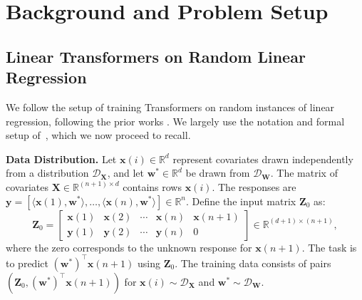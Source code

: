 \documentclass[11pt]{article}
\numberwithin{equation}{section}
\begin{document}
\section{Background and Problem Setup}
\label{Section:LinearTransformerArchitecture}
\vspace{-6pt}
\subsection{Linear Transformers on Random Linear Regression}
We follow the setup of training Transformers on random instances of linear regression, following the prior works \citep{garg2022can, akyurek2022learning, von2023transformers, ahn2024transformers}. We largely use the notation and formal setup of~\citep{ahn2024transformers}, which we now proceed to recall.

\textbf{Data Distribution.} Let \(\mathbf{x}(i) \in \mathbb{R}^d\) represent covariates drawn independently from a distribution \(\mathcal{D}_{\mathbf{X}}\), and let \(\mathbf{w}^* \in \mathbb{R}^d\) be drawn from \(\mathcal{D}_{\mathbf{W}}\). The matrix of covariates \(\mathbf{X} \in \mathbb{R}^{(n + 1) \times d}\) contains rows \(\mathbf{x}(i)\). The responses are \(\mathbf{y} = [\langle \mathbf{x}(1), \mathbf{w}^* \rangle, \dots, \langle \mathbf{x}(n), \mathbf{w}^* \rangle] \in \mathbb{R}^n\). Define the input matrix \(\mathbf{Z}_0\) as:
\begin{equation}
\mathbf{Z}_0 = 
\begin{bmatrix}
\mathbf{x}(1) & \mathbf{x}(2) & \cdots & \mathbf{x}(n) & \mathbf{x}(n+1) \\
\mathbf{y}(1) & \mathbf{y}(2) & \cdots & \mathbf{y}(n) & 0
\end{bmatrix} \in \mathbb{R}^{(d+1) \times (n+1)},
\end{equation}
where the zero corresponds to the unknown response for \(\mathbf{x}(n+1)\). The task is to predict \((\mathbf{w}^*)^{\top} \mathbf{x}(n+1)\) using \(\mathbf{Z}_0\). The training data consists of pairs \((\mathbf{Z}_0, (\mathbf{w}^*)^\top \mathbf{x}(n+1))\) for \(\mathbf{x}(i) \sim \mathcal{D}_{\mathbf{X}}\) and \(\mathbf{w}^* \sim \mathcal{D}_{\mathbf{W}}\).
\end{document}
